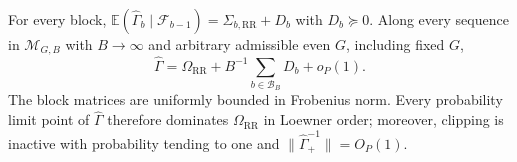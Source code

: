 For every block, \(\mathbb E(\widehat\Gamma_b\mid\mathcal F_{b-1})=\Sigma_{b,\mathrm{RR}}+D_b\) with \(D_b\succeq0\).  Along every sequence in \(\mathcal M_{G,B}\) with \(B\to\infty\) and arbitrary admissible even \(G\), including fixed \(G\),
\[
\widehat\Gamma=\Omega_{\mathrm{RR}}+B^{-1}\sum_{b\in\mathcal B_B}D_b+o_P(1).
\]
The block matrices are uniformly bounded in Frobenius norm.  Every probability limit point of \(\widehat\Gamma\) therefore dominates \(\Omega_{\mathrm{RR}}\) in Loewner order; moreover, clipping is inactive with probability tending to one and \(\|\widehat\Gamma_+^{-1}\|=O_P(1)\).